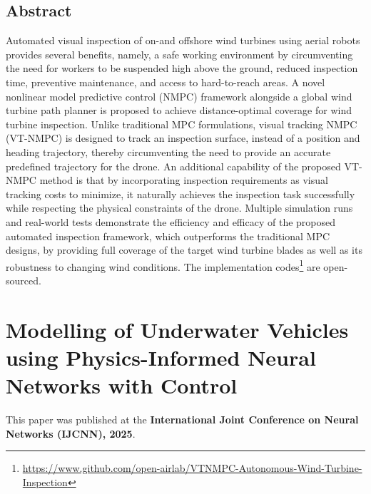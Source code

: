 \documentclass[
10pt, %
b5paper, %
twoside, %
openright  %
]{book}  %
\begin{document}
\section{Abstract}
Automated visual inspection of on-and offshore wind turbines using aerial robots provides several benefits, namely, a safe working environment by circumventing the need for workers to be suspended high above the ground, reduced inspection time, preventive maintenance, and access to hard-to-reach areas. A novel nonlinear model predictive control (NMPC) framework alongside a global wind turbine path planner is proposed to achieve distance-optimal coverage for wind turbine inspection. Unlike traditional MPC formulations, visual tracking NMPC (VT-NMPC) is designed to track an inspection surface, instead of a position and heading trajectory, thereby circumventing the need to provide an accurate predefined trajectory for the drone. An additional capability of the proposed VT-NMPC method is that by incorporating inspection requirements as visual tracking costs to minimize, it naturally achieves the inspection task successfully while respecting the physical constraints of the drone. Multiple simulation runs and real-world tests demonstrate the efficiency and efficacy of the proposed automated inspection framework, which outperforms the traditional MPC designs, by providing full coverage of the target wind turbine blades as well as its robustness to changing wind conditions. The implementation codes\footnote{\url{https://www.github.com/open-airlab/VTNMPC-Autonomous-Wind-Turbine-Inspection}} are open-sourced.
\newpage


%



\chapter{Modelling of Underwater Vehicles using
Physics-Informed Neural Networks with Control}
\vspace{1cm}
This paper was published at the \textbf{International Joint Conference on Neural Networks (IJCNN), 2025}.
\end{document}

